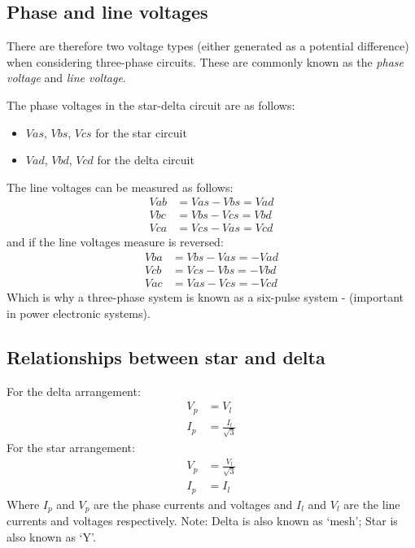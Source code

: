 \subsection{Phase and line voltages}
There are therefore two voltage types (either generated as a potential difference) when considering three-phase circuits. These are commonly known as the \textit{phase voltage} and \textit{line voltage}.

The phase voltages in the star-delta circuit are as follows:
\begin{itemize}
	\item $Vas$, $Vbs$, $Vcs$ for the star circuit
	\item $Vad$, $Vbd$, $Vcd$ for the delta circuit
\end{itemize}
The line voltages can be measured as follows:
\begin{align}
	Vab & = Vas - Vbs = Vad \\
	Vbc & = Vbs - Vcs = Vbd \\
	Vca & = Vcs - Vas = Vcd
\end{align}
and if the line voltages measure is reversed:
\begin{align}
	Vba & = Vbs - Vas = -Vad \\
	Vcb & = Vcs - Vbs = -Vbd \\
	Vac & = Vas - Vcs = -Vcd
\end{align}
Which is why a three-phase system is known as a six-pulse system - (important in power electronic systems).
\subsection{Relationships between star and delta}
For the delta arrangement:
\begin{align}
	V_p & = V_l                  \\
	I_p & = \frac{I_l}{\sqrt{3}}
\end{align}
For the star arrangement:
\begin{align}
	V_p & = \frac{V_l}{\sqrt{3}} \\
	I_p & = I_l
\end{align}
Where $I_p$ and $V_p$ are the phase currents and voltages and $I_l$ and $V_l$ are the line currents and voltages respectively. Note: Delta is also known as `mesh'; Star is also known as `Y'.
